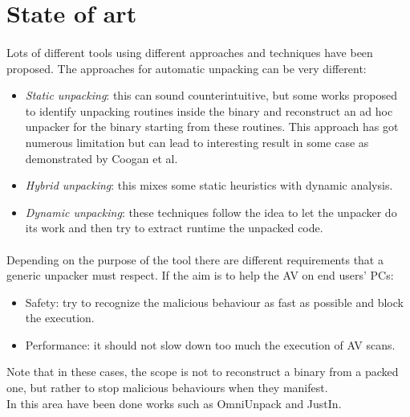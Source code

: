 \section{State of art}
\paragraph{}
Lots of different tools using different approaches and techniques have been proposed. 
The approaches for automatic unpacking can be very different:
\begin{itemize}
\item \textit{Static unpacking}: this can sound counterintuitive, but some works proposed to identify unpacking routines inside the binary and reconstruct an ad hoc unpacker for the binary starting from these routines. This approach has got numerous limitation but can lead to interesting result in some case as demonstrated by Coogan et al.\cite{coogan}
\item \textit{Hybrid unpacking}: this mixes some static heuristics with dynamic analysis.
\item \textit{Dynamic unpacking}: these techniques follow the idea to let the unpacker do its work and then try to extract runtime the unpacked code. 
\end{itemize}
\paragraph{}
Depending on the purpose of the tool there are different requirements that a generic unpacker must respect. If the aim is to help the AV on end users' PCs:
\begin{itemize}
\item Safety: try to recognize the malicious behaviour as fast as possible and block the execution. 
\item Performance: it should not slow down too much the execution of AV scans.
\end{itemize}
Note that in these cases, the scope is not to reconstruct a binary from a packed one, but rather to stop malicious behaviours when they manifest. \\
In this area have been done works such as OmniUnpack and JustIn.
